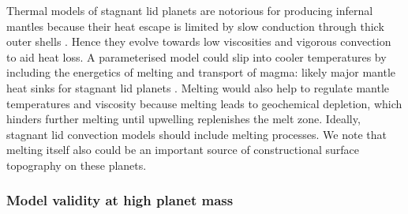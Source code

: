 


Thermal models of stagnant lid planets are notorious for producing infernal mantles because their heat escape is limited by slow conduction through thick outer shells \citep[e.g.,][]{driscoll_thermal_2014}. Hence they evolve towards low viscosities and vigorous convection to aid heat loss. A parameterised model could slip into cooler temperatures by including the energetics of melting and transport of magma: likely major mantle heat sinks for stagnant lid planets \citep{moore_heatpipe_2017, lourenco_efficient_2018}. Melting would also help to regulate mantle temperatures and viscosity because melting leads to geochemical depletion, which hinders further melting until upwelling replenishes the melt zone. Ideally, stagnant lid convection models should include melting processes. We note that melting itself also could be an important source of constructional surface topography on these planets.






\subsubsection{Model validity at high planet mass}

